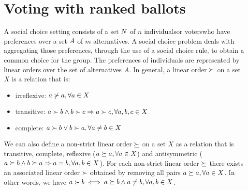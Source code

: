 
\section{Voting with ranked ballots}
A social choice setting consists of a set $N$ of $n$ individuals\textemdash or voters\textemdash who have preferences over a set $A$ of $m$ alternatives.
A social choice problem deals with aggregating those preferences, through the use of a social choice rule, to obtain a common choice for the group.
The preferences of individuals are represented by linear orders over the set of alternatives $A$.
In general, a linear order $\mathop{\succ}$ on a set $X$ is a relation that is:
\vspace{-0.3em}
\begin{itemize}
	\itemsep-0.5em 
	\item irreflexive: $a \not\succ a, \forall a \in X$
	\item transitive: $a \succ b \land b \succ c \Rightarrow a \succ c, \forall a,b,c \in X$
	\item complete: $a \succ b \lor b \succ a, \forall a \neq b \in X$
\end{itemize} 
\vspace{-0.3em}
We can also define a non-strict linear order $\mathop{\succeq}$ on a set $X$ as a relation that is transitive, complete, reflexive ($a \succeq a, \forall a \in X$) and antisymmetric ($a \succeq b \land b \succeq a \Rightarrow a = b, \forall a,b \in X$).
For each non-strict linear order $\succeq$ there exists an associated linear order $\succ$ obtained by removing all pairs $a \succeq a, \forall a \in X$. In other words, we have $a \succ b \iff a \succeq b \land a \neq b, \forall a,b \in X$.

